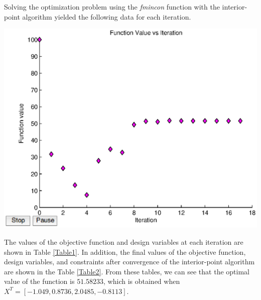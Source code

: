 \documentclass[11pt]{article}
\begin{document}

\begin{problem}{1}
\end{problem}
\begin{solution}

\end{solution}
Solving the optimization problem using the \emph{fmincon} function with the interior-point algorithm yielded the following data for each iteration.

\begin{center}
\includegraphics[scale=0.75]{problem1/problem1.eps}
\end{center}

The values of the objective function and design variables at each iteration are shown in Table \ref{Table1}. In addition, the final values of the objective function, design variables, and constraints after convergence of the interior-point algorithm are shown in the Table \ref{Table2}. From these tables, we can see that the optimal value of the function is $51.58233$, which is obtained when $X^T = [-1.049, 0.8736, 2.0485, -0.8113]$.
\end{document}
